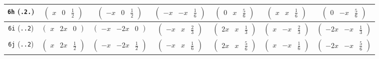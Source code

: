 \documentclass[fleqn,9pt,landscape]{jsarticle}
\begin{document}
\begin{center}
\begin{longtable}{ccccccc}
{\tt 6h} ({\tt .2.}) & $ \begin{pmatrix} x & 0 & \frac{1}{2} \end{pmatrix} $ & $ \begin{pmatrix} - x & 0 & \frac{1}{2} \end{pmatrix} $ & $ \begin{pmatrix} - x & - x & \frac{1}{6} \end{pmatrix} $ & $ \begin{pmatrix} 0 & x & \frac{5}{6} \end{pmatrix} $ & $ \begin{pmatrix} x & x & \frac{1}{6} \end{pmatrix} $ & $ \begin{pmatrix} 0 & - x & \frac{5}{6} \end{pmatrix} $ \\ \hline
{\tt 6i} ({\tt ..2}) & $ \begin{pmatrix} x & 2 x & 0 \end{pmatrix} $ & $ \begin{pmatrix} - x & - 2 x & 0 \end{pmatrix} $ & $ \begin{pmatrix} - x & x & \frac{2}{3} \end{pmatrix} $ & $ \begin{pmatrix} 2 x & x & \frac{1}{3} \end{pmatrix} $ & $ \begin{pmatrix} x & - x & \frac{2}{3} \end{pmatrix} $ & $ \begin{pmatrix} - 2 x & - x & \frac{1}{3} \end{pmatrix} $ \\ \hline
{\tt 6j} ({\tt ..2}) & $ \begin{pmatrix} x & 2 x & \frac{1}{2} \end{pmatrix} $ & $ \begin{pmatrix} - x & - 2 x & \frac{1}{2} \end{pmatrix} $ & $ \begin{pmatrix} - x & x & \frac{1}{6} \end{pmatrix} $ & $ \begin{pmatrix} 2 x & x & \frac{5}{6} \end{pmatrix} $ & $ \begin{pmatrix} x & - x & \frac{1}{6} \end{pmatrix} $ & $ \begin{pmatrix} - 2 x & - x & \frac{5}{6} \end{pmatrix} $ \\ \hline

\end{longtable}
\end{center}
\end{document}
